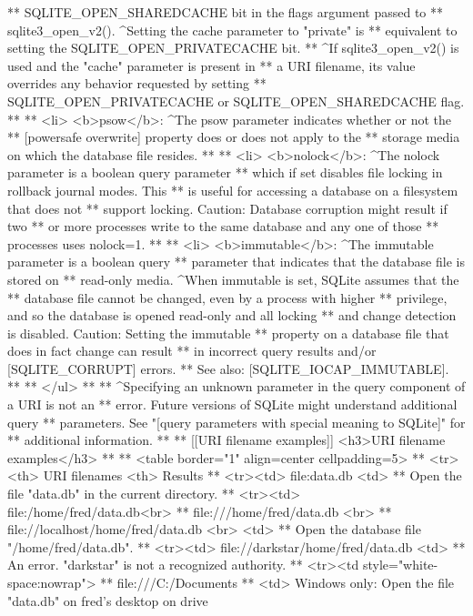 \begin{Codex}[label=sqlite3.h,numbers=left]
{**     SQLITE_OPEN_SHAREDCACHE bit in the flags argument passed to
**     sqlite3_open_v2(). ^Setting the cache parameter to "private" is 
**     equivalent to setting the SQLITE_OPEN_PRIVATECACHE bit.
**     ^If sqlite3_open_v2() is used and the "cache" parameter is present in
**     a URI filename, its value overrides any behavior requested by setting
**     SQLITE_OPEN_PRIVATECACHE or SQLITE_OPEN_SHAREDCACHE flag.
**
**  <li> <b>psow</b>: ^The psow parameter indicates whether or not the
**     [powersafe overwrite] property does or does not apply to the
**     storage media on which the database file resides.
**
**  <li> <b>nolock</b>: ^The nolock parameter is a boolean query parameter
**     which if set disables file locking in rollback journal modes.  This
**     is useful for accessing a database on a filesystem that does not
**     support locking.  Caution:  Database corruption might result if two
**     or more processes write to the same database and any one of those
**     processes uses nolock=1.
**
**  <li> <b>immutable</b>: ^The immutable parameter is a boolean query
**     parameter that indicates that the database file is stored on
**     read-only media.  ^When immutable is set, SQLite assumes that the
**     database file cannot be changed, even by a process with higher
**     privilege, and so the database is opened read-only and all locking
**     and change detection is disabled.  Caution: Setting the immutable
**     property on a database file that does in fact change can result
**     in incorrect query results and/or [SQLITE_CORRUPT] errors.
**     See also: [SQLITE_IOCAP_IMMUTABLE].
**       
** </ul>
**
** ^Specifying an unknown parameter in the query component of a URI is not an
** error.  Future versions of SQLite might understand additional query
** parameters.  See "[query parameters with special meaning to SQLite]" for
** additional information.
**
** [[URI filename examples]] <h3>URI filename examples</h3>
**
** <table border="1" align=center cellpadding=5>
** <tr><th> URI filenames <th> Results
** <tr><td> file:data.db <td> 
**          Open the file "data.db" in the current directory.
** <tr><td> file:/home/fred/data.db<br>
**          file:///home/fred/data.db <br> 
**          file://localhost/home/fred/data.db <br> <td> 
**          Open the database file "/home/fred/data.db".
** <tr><td> file://darkstar/home/fred/data.db <td> 
**          An error. "darkstar" is not a recognized authority.
** <tr><td style="white-space:nowrap"> 
**          file:///C:/Documents%
**     <td> Windows only: Open the file "data.db" on fred's desktop on drive
}
\end{Codex}
